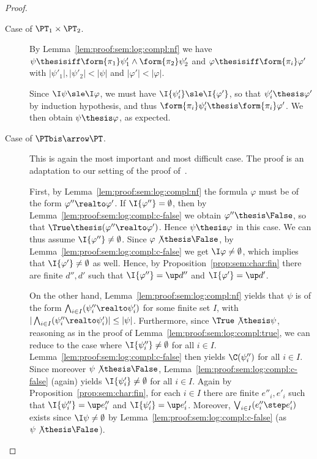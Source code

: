 \begin{proof}
\begin{description}
\item[Case of $\PT_1 \times \PT_2$.]
By Lemma~\ref{lem:proof:sem:log:compl:nf}
we have
$\psi \thesisiff \form{\pi_1} \psi'_1 \land \form{\pi_2} \psi'_2$
and $\varphi \thesisiff \form{\pi_i} \varphi'$
with $|\psi'_1|, |\psi'_2| < |\psi|$
and $|\varphi'| < |\varphi|$.

Since $\I\psi \sle \I\varphi$,
we must have
$\I{\psi'_i} \sle \I{\varphi'}$,
so that
$\psi'_i \thesis \varphi'$ by induction hypothesis,
and thus
$\form{\pi_i}\psi'_i \thesis \form{\pi_i}\varphi'$.
We then obtain $\psi \thesis \varphi$, as expected.

\item[Case of $\PTbis \arrow \PT$.]
This is again the most important and most difficult case.
The proof is an adaptation to our setting
of the proof of~\cite[Proposition 10.5.2]{ac98book}.

First, 
by Lemma~\ref{lem:proof:sem:log:compl:nf}
the formula
$\varphi$ must be of the form $\varphi'' \realto \varphi'$.
If $\I{\varphi''} = \emptyset$,
then by Lemma~\ref{lem:proof:sem:log:compl:c-false}
we obtain $\varphi'' \thesis \False$,
so that $\True \thesis (\varphi'' \realto \varphi')$.
Hence $\psi \thesis \varphi$ in this case.
%
We can thus assume $\I{\varphi''} \neq \emptyset$.
Since $\varphi \not\thesis \False$,
by Lemma~\ref{lem:proof:sem:log:compl:c-false}
we get
$\I\varphi \neq \emptyset$,
which implies that $\I{\varphi'} \neq \emptyset$ as well.
Hence, by Proposition~\ref{prop:sem:char:fin}
there are finite $d'',d'$
such that $\I{\varphi''} = \up d''$
and $\I{\varphi'} = \up d'$.


On the other hand,
Lemma~\ref{lem:proof:sem:log:compl:nf} yields that
$\psi$ is of the form
$\bigwedge_{i \in I} (\psi''_i \realto \psi'_i)$
for some finite set $I$,
with
$|\bigwedge_{i \in I} (\psi''_i \realto \psi'_i)| \leq |\psi|$.
Furthermore, since $\True \not\thesis \psi$,
reasoning as in the proof of Lemma~\ref{lem:proof:sem:log:compl:true},
we can reduce to the case where 
$\I{\psi''_i} \neq \emptyset$ for all $i \in I$.
Lemma~\ref{lem:proof:sem:log:compl:c-false}
then yields $\C(\psi''_i)$ for all $i \in I$.
%
Since moreover $\psi \not\thesis \False$,
Lemma~\ref{lem:proof:sem:log:compl:c-false} (again) yields
$\I{\psi'_i} \neq \emptyset$ for all $i \in I$.
%
Again by Proposition~\ref{prop:sem:char:fin},
for each $i \in I$ there are finite $e''_i,e'_i$
such that $\I{\psi''_i} = \up e''_i$
and $\I{\psi'_i} = \up e'_i$.
%
Moreover, $\bigvee_{i \in I}(e''_i \step e'_i)$
exists since $\I\psi \neq \emptyset$
by Lemma~\ref{lem:proof:sem:log:compl:c-false}
(as $\psi \not\thesis \False$).



\end{description}
\end{proof}
